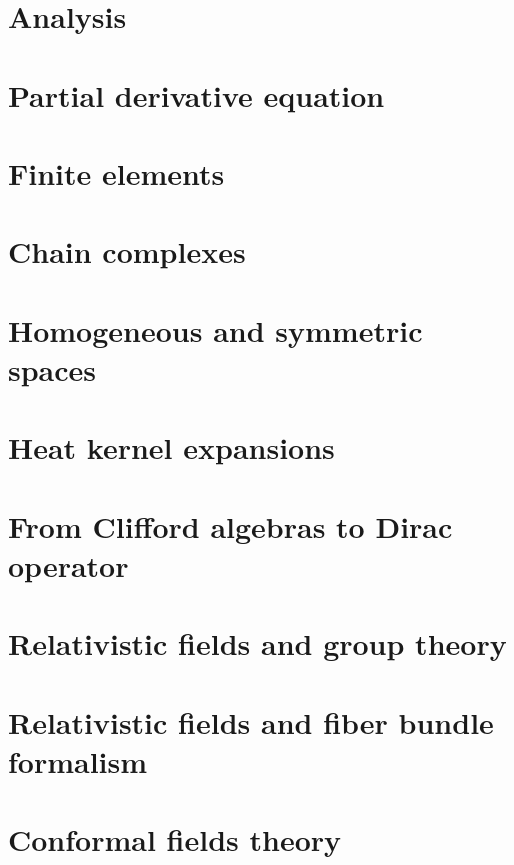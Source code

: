\documentclass[a4paper,twoside,11pt]{book}
\begin{document}
\chapter{Analysis}




\chapter{Partial derivative equation}


\chapter{Finite elements}


\chapter{Chain complexes}


\chapter{Homogeneous and symmetric spaces}




\chapter{Heat kernel expansions}


\chapter{From Clifford algebras to Dirac operator}



\chapter{Relativistic fields and group theory}


\chapter{Relativistic fields and fiber bundle formalism}


\chapter{Conformal fields theory}

\end{document}
